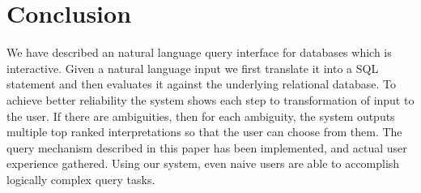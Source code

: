 \chapter{Conclusion}

We have described an natural language query
interface for databases which is interactive. Given a natural language
input we first translate it into a SQL statement and
then evaluates it against the underlying relational database. To achieve better reliability the system shows each step to transformation of input to the user. If there are ambiguities, then for each ambiguity, the system outputs multiple top ranked interpretations so that the user can choose from them. The query mechanism described in this paper has been implemented, and actual user experience gathered. Using our system, even naive users are
able to accomplish logically complex query tasks.